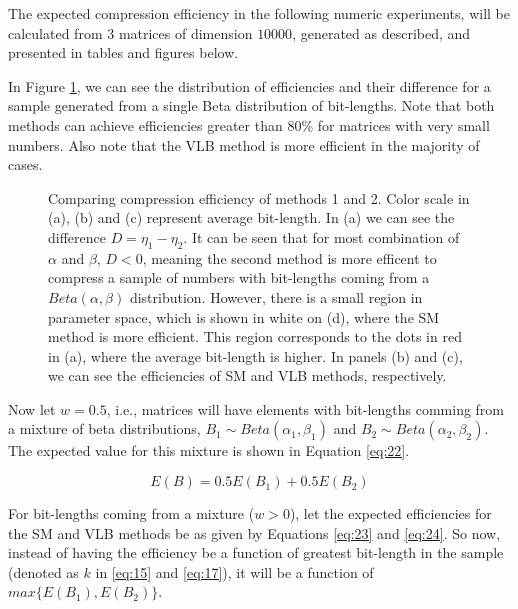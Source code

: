\documentclass[10pt]{article}
\begin{document}
The expected compression efficiency in the following numeric experiments, will be calculated from $3$ matrices of dimension $10000$, generated as described, and presented in tables and figures below. 
 
In Figure \ref{fig:06070809}, we can see the distribution of efficiencies and their difference for a sample generated from a single Beta distribution of bit-lengths. Note that both methods can achieve efficiencies greater than 80\% for matrices with very small numbers. Also note that the VLB method is more efficient in the majority of cases.
 
\begin{figure}[h]
  \centering
   \subfigure[SM-VLB  Difference ($D = \eta_1 - \eta_2$)]{ 
   }
  \caption{Comparing compression efficiency of methods 1 and 2. Color scale in (a), (b) and (c) represent average bit-length. In (a) we can see the difference $D = \eta_1 - \eta_2$. It can be seen that for most combination of $\alpha$ and $\beta$, $D<0$, meaning the second method is more efficent to compress a sample of numbers with bit-lengths coming from a $Beta(\alpha,\beta)$ distribution. However, there is a small region in parameter space, which is shown in white on (d), where the SM method is more efficient. This region corresponds to the dots in red in (a), where the average bit-length is higher. In panels (b) and (c), we can see the efficiencies of SM and VLB methods, respectively.}
  \label{fig:06070809}
\end{figure}
 
Now let $w = 0.5$, i.e., matrices will have elements with bit-lengths comming from a mixture of beta distributions, $B_1\sim Beta(\alpha_1,\beta_1)$ and $B_2\sim Beta(\alpha_2,\beta_2)$. The expected value for this mixture is shown in Equation \ref{eq:22}.
 
\begin{equation}\label{eq:22}
 E(B) = 0.5 E(B_1) + 0.5 E(B_2)
\end{equation}
 
For bit-lengths coming from a mixture ($w>0$), let the expected efficiencies for the SM and VLB methods be as given by Equations \ref{eq:23} and \ref{eq:24}. So now, instead of having the efficiency be a function of greatest bit-length in the sample (denoted as  $k$ in \ref{eq:15} and \ref{eq:17}), it will be a function of $max\{E(B_1),E(B_2)\}$.
\end{document}
